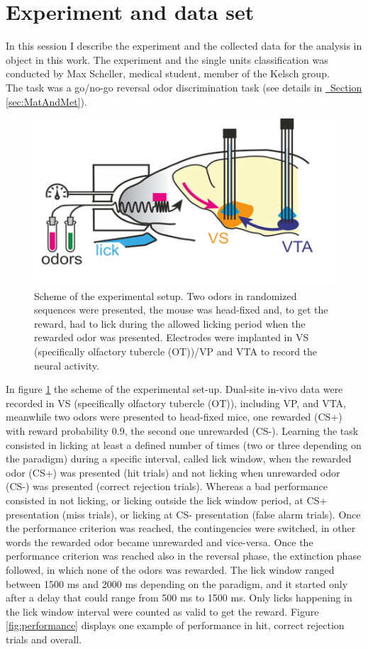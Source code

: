 \section{Experiment and data set}
\label{sec:Dataset}
\begin{framed}
In this session I describe the experiment and the collected data for the analysis in object in this work. The experiment and the single units classification was conducted by Max Scheller, medical student, member of the Kelsch group.\\The task was a go/no-go reversal odor discrimination task (see details in \hyperref[sec:MatAndMet]{~Section \ref*{sec:MatAndMet}}).
\begin{figure}[H]
    \centering
    \includegraphics[scale=0.92]{figures/Experiment.png}
    \caption{Scheme of the experimental setup. Two odors in randomized sequences were presented, the mouse was head-fixed and, to get the reward, had to lick during the allowed licking period when the rewarded odor was presented. Electrodes were implanted in VS (specifically olfactory tubercle (OT))/VP  and VTA to record the neural activity.}
    \label{fig:experiment}
\end{figure}
In figure \ref{fig:experiment} the scheme of the experimental set-up. Dual-site in-vivo data were recorded in VS (specifically olfactory tubercle (OT)), including VP, and VTA, meanwhile two odors were presented to head-fixed mice, one rewarded (CS+) with reward probability 0.9, the second one unrewarded (CS-). Learning the task consisted in licking at least a defined number of times (two or three depending on the paradigm) during a specific interval, called lick window, when the rewarded odor (CS+) was presented (hit trials) and not licking when unrewarded odor (CS-) was presented (correct rejection trials). Whereas a bad performance consisted in not licking, or licking outside the lick window period, at CS+ presentation (miss trials), or licking at CS- presentation (false alarm trials). Once the performance criterion was reached, the contingencies were switched, in other words the rewarded odor became unrewarded and vice-versa. Once the performance criterion was reached also in the reversal phase, the extinction phase followed, in which none of the odors was rewarded. The lick window ranged between 1500 ms and 2000 ms depending on the paradigm, and it started only after a delay that could range from 500 ms to 1500 ms. Only licks happening in the lick window interval were counted as valid to get the reward. Figure \ref{fig:performance} displays one example of performance in hit, correct rejection trials and overall.

\end{framed}
